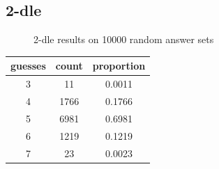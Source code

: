 \documentclass[11pt, oneside]{article} 	%
\begin{document}
\subsection{2-dle}

\begin{figure}[!htb]
 \centering
 \qquad
 \caption{2-dle results on 10000 random answer sets}%
\end{figure}

\begin{center}
\begin{tabular}{ |c|c|c| }
 \hline
guesses & count & proportion \\
 \hline
3 & 11 & 0.0011 \\
4 & 1766 & 0.1766 \\
5 & 6981 & 0.6981 \\
6 & 1219 & 0.1219 \\
7 & 23 & 0.0023 \\
 \hline
\end{tabular}
\end{center}
\end{document}
